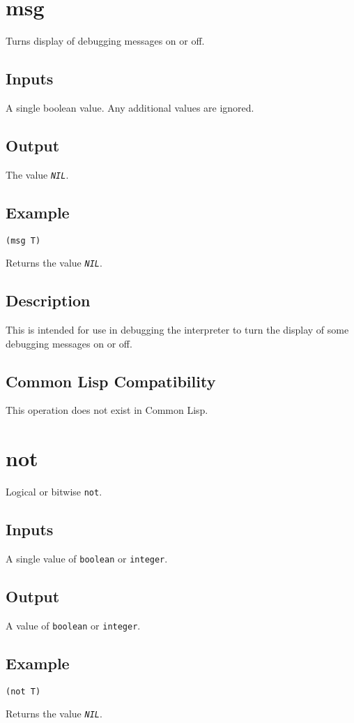 \documentclass[10pt, openany]{book}
\newcommand{\constant}[1]{\emph{\texttt{#1}}}
\newcommand{\keyword}[1]{\texttt{#1}}
\newcommand{\datatype}[1]{\texttt{#1}}
\newcommand{\cl}{Common Lisp}
\begin{document}
\section{msg}
Turns display of debugging messages on or off.
\subsection{Inputs}
A single boolean value.  Any additional values are ignored.
\subsection{Output}
The value \constant{NIL}.
\subsection{Example}
\begin{lstlisting}
(msg T)
\end{lstlisting}
Returns the value \constant{NIL}.
\subsection{Description}
This is intended for use in debugging the interpreter to turn the display of some debugging messages on or off.
\subsection{Common Lisp Compatibility}
This operation does not exist in \cl.

\section{not}
Logical or bitwise \keyword{not}.
\subsection{Inputs}
A single value of \datatype{boolean} or \datatype{integer}.
\subsection{Output}
A value of \datatype{boolean} or \datatype{integer}.
\subsection{Example}
\begin{lstlisting}
(not T)
\end{lstlisting}
Returns the value \constant{NIL}.
\end{document}
